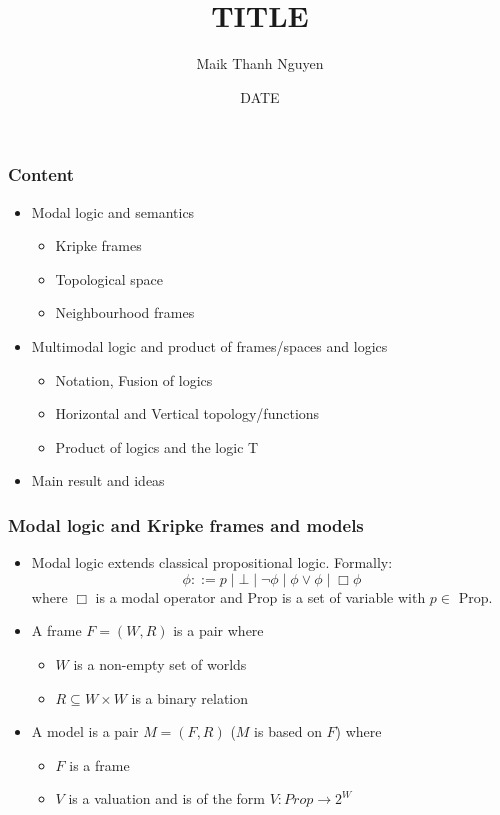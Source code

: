 \documentclass[hyperref={pdfpagelabels=false},t,10pt]{beamer}
\title{TITLE}
\author[© author]{Maik Thanh Nguyen}
\institute{Technische Universit\"at Dresden}
\date{DATE}
\begin{document}
\addtocounter{framenumber}{-1}
\maketitle

\begin{frame}
  \frametitle{Content}

  \begin{itemize}
  \item Modal logic and semantics
    \begin{itemize}
        \item Kripke frames
        \item Topological space
        \item Neighbourhood frames
     \end{itemize}
  \item Multimodal logic and product of frames/spaces and logics
    \begin{itemize}
      \item Notation, Fusion of logics
      \item Horizontal and Vertical topology/functions
      \item Product of logics and the logic T
    \end{itemize}
  \item Main result and ideas
  \end{itemize}
\end{frame}

\begin{frame}
  \frametitle{Modal logic and Kripke frames and models}
  \begin{itemize}
    \item Modal logic extends classical propositional logic. Formally:
    $$\phi ::= p \mid \bot \mid \neg \phi \mid \phi \lor \phi \mid \Box \phi$$
    where $\Box$ is a modal operator and Prop is a set of variable with $p \in$ Prop.
     \pause

    \item A frame $F = (W,R)$ is a pair where 
    \begin{itemize}
      \item $W$ is a non-empty set of worlds
      \item $R \subseteq W \times W$ is a binary relation  
    \end{itemize}

    \item A model is a pair $M = (F,R)$ ($M$ is based on $F$) where
      \begin{itemize}
        \item $F$ is a frame
        \item $V$ is a valuation and is of the form $V : Prop \rightarrow 2^W$
      \end{itemize}
  \end{itemize}
\end{frame}
\end{document}
